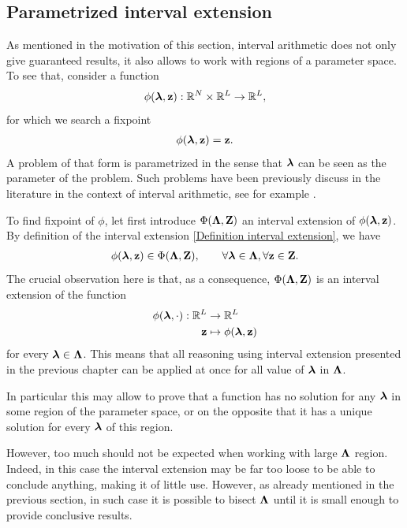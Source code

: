 \documentclass[
11pt, %
american, %
singlespacing, %
final, %
nolistspacing, %
liststotoc, %
headsepline, %
]{MastersDoctoralThesis} %
\begin{document}
\subsection{Parametrized interval extension}
\label{Section: Parametrized interval extension}

As mentioned in the motivation of this section, interval arithmetic does not only give guaranteed results, it also allows to work with regions of a parameter space. To see that, consider a function
\begin{align}
	\phi(\boldsymbol{\mathrm{\lambda}}, \boldsymbol{\mathrm{z}}) : \mathbb{R}^N \times \mathbb{R}^L \rightarrow \mathbb{R}^L,
\end{align}
for which we search a fixpoint
\begin{align}
	\phi(\boldsymbol{\mathrm{\lambda}}, \boldsymbol{\mathrm{z}}) = \boldsymbol{\mathrm{z}}.
\end{align}
A problem of that form is parametrized in the sense that $\boldsymbol{\mathrm{\lambda}}$ can be seen as the parameter of the problem. Such problems have been previously discuss in the literature in the context of interval arithmetic, see for example \cite{neumaier1988enclosure}.

To find fixpoint of $\phi$, let first introduce $\Phi(\boldsymbol{\mathrm{\Lambda}}, \boldsymbol{\mathrm{Z}})$ an interval extension of $\phi(\boldsymbol{\mathrm{\lambda}}, \boldsymbol{\mathrm{z}})$. By definition of the interval extension \eqref{Definition interval extension}, we have
\begin{align}
	\phi(\boldsymbol{\mathrm{\lambda}}, \boldsymbol{\mathrm{z}}) \in \Phi(\boldsymbol{\mathrm{\Lambda}}, \boldsymbol{\mathrm{Z}}), \qquad \forall \boldsymbol{\mathrm{\lambda}} \in \boldsymbol{\mathrm{\Lambda}}, \forall \boldsymbol{\mathrm{z}} \in \boldsymbol{\mathrm{Z}}.
\end{align}
The crucial observation here is that, as a consequence, $\Phi(\boldsymbol{\mathrm{\Lambda}}, \boldsymbol{\mathrm{Z}})$ is an interval extension of the function
\begin{align}
	\phi(\boldsymbol{\mathrm{\lambda}}, \cdot) : \mathbb{R}^L &\rightarrow \mathbb{R}^L \\
	\boldsymbol{\mathrm{z}} &\mapsto \phi(\boldsymbol{\mathrm{\lambda}}, \boldsymbol{\mathrm{z}})
\end{align}
for every $\boldsymbol{\mathrm{\lambda}} \in \boldsymbol{\mathrm{\Lambda}}$. This means that all reasoning using interval extension presented in the previous chapter can be applied at once for all value of $\boldsymbol{\mathrm{\lambda}}$ in $\boldsymbol{\mathrm{\Lambda}}$.

In particular this may allow to prove that a function has no solution for any $\boldsymbol{\mathrm{\lambda}}$ in some region of the parameter space, or on the opposite that it has a unique solution for every $\boldsymbol{\mathrm{\lambda}}$ of this region.

However, too much should not be expected when working with large $\boldsymbol{\mathrm{\Lambda}}$ region. Indeed, in this case the interval extension may be far too loose to be able to conclude anything, making it of little use. However, as already mentioned in the previous section, in such case it is possible to bisect $\boldsymbol{\mathrm{\Lambda}}$ until it is small enough to provide conclusive results.
\end{document}

